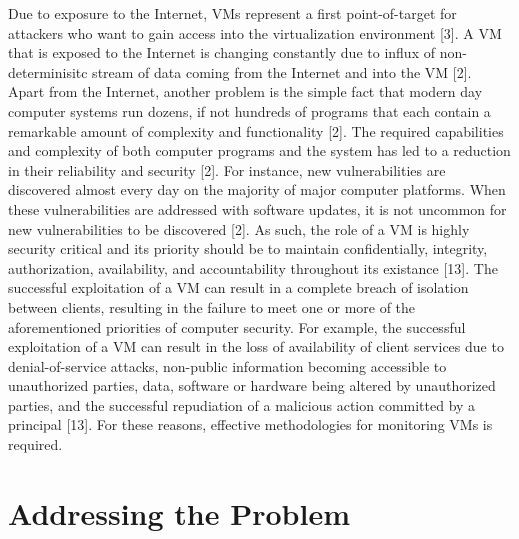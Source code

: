 \documentclass{report}
\begin{document}
\begin{spacing}{1.5}
{\large 
Due to exposure to the Internet, VMs represent a first point-of-target for attackers who want to gain access into the virtualization environment [3]. A VM that is exposed to the Internet is changing constantly due to influx of non-determinisitc stream of data coming from the Internet and into the VM [2]. Apart from the Internet, another problem is the simple fact that modern day computer systems run dozens, if not hundreds of programs that each contain a remarkable amount of complexity and functionality [2]. The required capabilities and complexity of both computer programs and the system has led to a reduction in their reliability and security [2]. For instance, new vulnerabilities are discovered almost every day on the majority of major computer platforms. When these vulnerabilities are addressed with software updates, it is not uncommon for new vulnerabilities to be discovered [2]. As such, the role of a VM is highly security critical and its priority should be to maintain confidentially, integrity, authorization, availability, and accountability throughout its existance [13]. The successful exploitation of a VM can result in a complete breach of isolation between clients, resulting in the failure to meet one or more of the aforementioned priorities of computer security. For example, the successful exploitation of a VM can result in the loss of availability of client services due to denial-of-service attacks, non-public information becoming accessible to unauthorized parties, data, software or hardware being altered by unauthorized parties, and the successful repudiation of a malicious action committed by a principal [13]. For these reasons, effective methodologies for monitoring VMs is required.
\newline
}

\section{Addressing the Problem}


\end{spacing}
\end{document}
